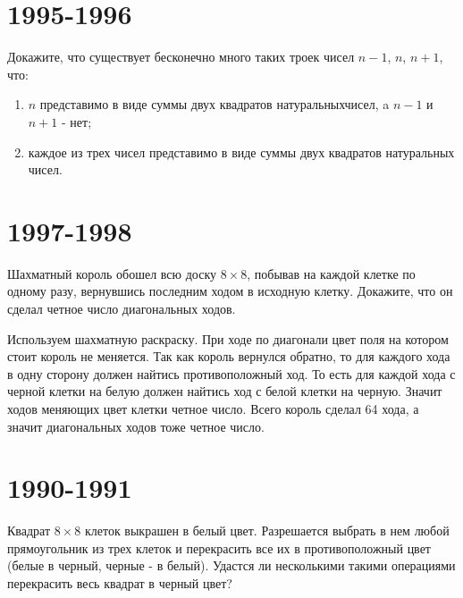 \documentclass[11pt, a4paper]{template}
\begin{document}
\chapter{1995-1996}

\begin{exercise}
Докажите, что существует бесконечно много таких троек чисел $n-1$, $n$, $n+1$, что:
\begin{enumerate}
\item $n$ представимо в виде суммы двух квадратов натуральныхчисел, a $n - 1$ и $n + 1$ - нет;
\item каждое из трех чисел представимо в виде суммы двух квадратов натуральных чисел.
\end{enumerate}
\end{exercise}

\chapter{1997-1998}

\begin{exercise}
Шахматный король обошел всю доску $8 \times 8$, побывав на каждой клетке по одному разу, вернувшись последним ходом в исходную клетку. Докажите, что он сделал четное число диагональных ходов.
\end{exercise}

\begin{solution}
Используем шахматную раскраску. При ходе по диагонали цвет поля на котором стоит король не меняется. Так как король вернулся обратно, то для каждого хода в одну сторону должен найтись противоположный ход. То есть для каждой хода с черной клетки на белую должен найтись ход с белой клетки на черную. Значит ходов меняющих цвет клетки четное число. Всего король сделал 64 хода, а значит диагональных ходов тоже четное число. 
\end{solution}

\chapter{1990-1991}

\begin{exercise}
Квадрат $8 \times 8$ клеток выкрашен в белый цвет. Разрешается выбрать в нем любой прямоугольник из трех клеток и перекрасить все их в противоположный цвет (белые в черный, черные - в белый). Удастся ли несколькими такими операциями перекрасить весь квадрат в черный цвет?
\end{exercise}
\end{document}
